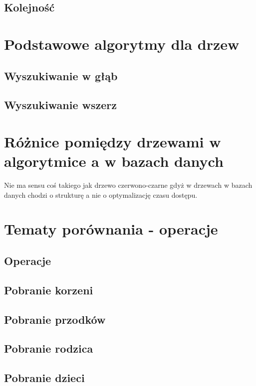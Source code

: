 \subsection{Kolejność}


\section{Podstawowe algorytmy dla drzew}
\subsection{Wyszukiwanie w głąb}
\subsection{Wyszukiwanie wszerz}


\section{Różnice pomiędzy drzewami w algorytmice a w bazach danych}

Nie ma sensu coś takiego jak drzewo czerwono-czarne gdyż w drzewach w bazach danych chodzi o strukturę a nie o optymalizację czasu dostępu.

\section{Tematy porównania - operacje}



\subsection{Operacje}
\subsection{Pobranie korzeni}
\subsection{Pobranie przodków}
\subsection{Pobranie rodzica}
\subsection{Pobranie dzieci}
